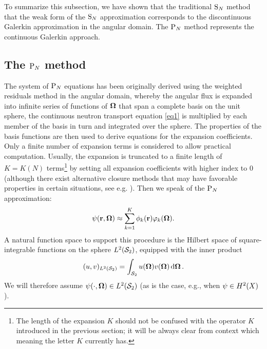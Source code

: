 

To summarize this subsection, we have shown that the traditional $\SN$ method that the weak form
of the $\SN$ approximation corresponds to the discontinuous Galerkin approximation in the angular domain. The $\PN$ method represents the continuous Galerkin approach.

\subsection{The $\PN$ method}\label{sec:PN}

The system of $\PN$ equations has been originally derived using the weighted residuals method in the angular domain,
whereby the angular flux is expanded into infinite series of functions of $\bomega$ that span a
complete basis on the unit sphere, the continuous neutron transport equation \eqref{eq1} is multiplied by each member of
the basis in turn and integrated over the sphere. The properties of the basis functions are then used to derive
equations for the expansion coefficients. Only a finite number of expansion terms is considered to allow practical computation.
Usually, the expansion is truncated to a finite length of $K = K(N)$ terms\footnote{The length of the expansion $K$
should not be confused with the operator $K$ introduced in the previous section; it will be always clear from context 
which meaning the letter $K$ currently has.} by setting all expansion coefficients with higher index to 0 (although there exist alternative closure methods that may have favorable properties in certain situations, see e.g.
\cite{Frank0}). Then we speak of the $\PN$ approximation:
\begin{equation}\label{eq1.1}
  \psi(\br,\bomega) \approx \sum_{k=1}^{ K} \phi_k(\br) \varphi_k(\bomega).
\end{equation}
A natural function space to support this procedure is the Hilbert space of
square-integrable functions on the sphere $\Lp[2](\Sphere)$, equipped with the inner product
\begin{equation}\label{eq:s2_ip}
	(u, v)_{\Lp[2](\Sphere)} = \intA{u(\bomega) {v(\bomega)}}.
\end{equation}
We will therefore assume \mbox{$\psi(\cdot,\bomega)\in\Lp[2](\Sphere)$} (as is the case, e.g., when 
$\psi\in\Hp[2](X)$).


